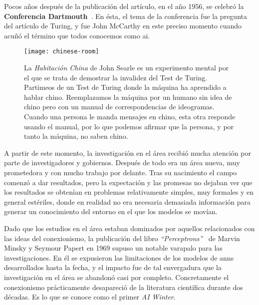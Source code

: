 Pocos años después de la publicación del artículo, en el año 1956, se celebró la \textbf{Conferencia Dartmouth}~\cite{mccarthy1956dartmouth}. En ésta, el tema de la conferencia fue la pregunta del artículo de Turing, y fue John McCarthy en este preciso momento cuando acuñó el término que todos conocemos como \ac{ai}.

\begin{figure}[!b]
	\centering
	\texttt{[image: chinese-room]}
	\label{fig:chinese-room}
	\caption[Experimento mental de la \textit{Habitación China}, por John Searle]{La \textit{Habitación China} de John Searle es un experimento mental por el que se trata de demostrar la invalidez del Test de Turing. Partimeos de un Test de Turing donde la máquina ha aprendido a hablar chino. Reemplazamos la máquina por un humano sin idea de chino pero con un manual de correspondencias de ideogramas. Cuando una persona le manda mensajes en chino, esta otra responde usando el manual, por lo que podemos afirmar que la persona, y por tanto la máquina, no saben chino.}
\end{figure}

A partir de este momento, la investigación en el área recibió mucha atención por parte de investigadores y gobiernos. Después de todo era un área nueva, muy prometedora y con mucho trabajo por delante. Tras su nacimiento el campo comenzó a dar resultados, pero la expectación y las promesas no dejaban ver que los resultados se obtenían en problemas relativamente simples, muy formales y en general estériles, donde en realidad no era necesaria demasiada información para generar un conocimiento del entorno en el que los modelos se movían.

Dado que los estudios en el área estaban dominados por aquellos relacionados con las ideas del conexionismo, la publicación del libro \textit{\enquote{Perceptrons}}~\cite{minsky1969perceptrons} de Marvin Minsky y Seymour Papert en 1969 supuso un notable varapalo para las investigaciones. En él se expusieron las limitaciones de los modelos de \acp{ann} desarrollados hasta la fecha, y el impacto fue de tal envergadura que la investigación en el área se abandonó casi por completo. Concretamente el conexionismo prácticamente desapareció de la literatura científica durante dos décadas. Es lo que se conoce como el primer \textit{AI Winter}.

